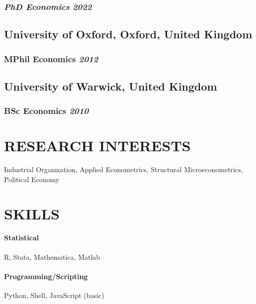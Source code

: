 \documentclass{article}
\begin{document}
\subsubsection{\emph{PhD Economics} \hfill \emph{2022}}

\subsection{University of Oxford, Oxford, United Kingdom}
\subsubsection{MPhil Economics \hfill \emph{2012}}

\subsection{University of Warwick, United Kingdom}
\subsubsection{BSc Economics \hfill \emph{2010}}

\section{RESEARCH INTERESTS}
\noindent Industrial Organization, Applied Econometrics, Structural Microeconometrics, Political Economy

\section{SKILLS}
\paragraph{Statistical} R, Stata, Mathematica, Matlab
\paragraph{Programming/Scripting} Python, Shell, JavaScript (basic)
\end{document}
